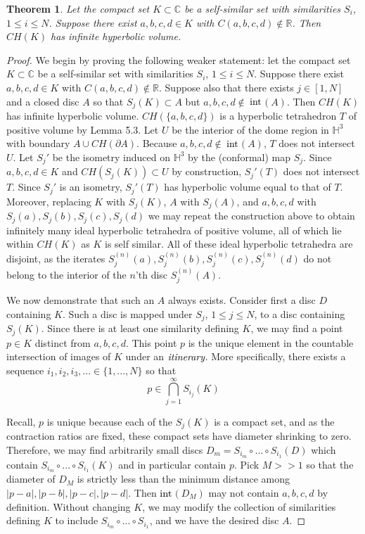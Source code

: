 \documentclass[11pt]{article}
\newtheorem{tm}{Theorem}[section]
\newcommand\comp{{\mathbb{C}}}
\begin{document}
\begin{tm}
    Let the compact set  $K \subset \comp$ be a self-similar set with similarities $S_i$, $1 \leq i \leq N$. Suppose there exist $a,b,c,d \in K$ with $C(a,b,c,d) \notin \mathbb{R}$. Then $CH(K)$ has infinite hyperbolic volume.
\end{tm}

 \begin{proof}We begin by proving the following weaker statement: let the compact set  $K \subset \comp$ be a self-similar set with similarities $S_i$, $1 \leq i \leq N$. Suppose there exist $a,b,c,d \in K$ with $C(a,b,c,d) \notin \mathbb{R}$. Suppose also that there exists $j \in [1,N]$ and a closed disc $A$ so that $S_j(K) \subset A$ but $a,b,c,d \notin \ $$ \rm{int}$$(A)$. Then $CH(K)$ has infinite hyperbolic volume. $CH(\{a,b,c,d\})$ is a hyperbolic tetrahedron $T$ of positive volume by Lemma 5.3. Let $U$ be the interior of the dome region in $\mathbb{H}^3$ with boundary $A \cup CH(\partial A)$. Because $a,b,c,d \notin \ $$\rm{int}$$(A)$, $T$ does not intersect $U$. Let $S_j'$ be the isometry induced on $\mathbb{H}^3$ by the (conformal) map $S_j$. Since $a,b,c,d \in K$ and $CH(S_j(K)) \subset U$ by construction, $S_j'(T)$ does not intersect $T$. Since $S_j'$ is an isometry, $S_j'(T)$ has hyperbolic volume equal to that of $T$.  Moreover, replacing $K$ with $S_j(K)$, $A$ with $S_j(A)$, and $a,b,c,d$ with $S_j(a), S_j(b), S_j(c), S_j(d)$ we may repeat the construction above to obtain infinitely many ideal hyperbolic tetrahedra of positive volume, all of which lie within $CH(K)$ as $K$ is self similar. All of these ideal hyperbolic tetrahedra are disjoint, as the iterates $S_j^{(n)}(a), S_j^{(n)}(b), S_j^{(n)}(c), S_j^{(n)}(d)$ do not belong to the interior of the $n$'th disc $S_j^{(n)}(A)$. 

\bigskip

We now demonstrate that such an $A$ always exists. Consider first a disc $D$ containing $K$. Such a disc is mapped under $S_j$, $1 \leq j \leq N$, to a disc containing $S_j(K)$. Since there is at least one similarity defining $K$, we may find a point $p \in K$ distinct from $a,b,c,d$. This point $p$ is the unique element in the countable intersection of images of $K$ under an $\emph{itinerary}$. More specifically, there exists a sequence $i_1,i_2,i_3,... \in  \{1,...,N\}$ so that $$p \in \bigcap_{j =1}^\infty S_{i_j}(K)$$

Recall, $p$ is unique because each of the $S_j(K)$ is a compact set, and as the contraction ratios are fixed, these compact sets have diameter shrinking to zero. Therefore, we may find arbitrarily small discs $D_m = S_{i_m} \circ ... \circ S_{i_1}(D)$ which contain $S_{i_m} \circ ... \circ S_{i_1}(K)$ and in particular contain $p$. Pick $M >> 1$ so that the diameter of $D_M$ is strictly less than the minimum distance among $|p-a|, |p-b|, |p-c|, |p-d|$. Then $\rm{int}$$(D_M)$ may not contain $a,b,c,d$ by definition. Without changing $K$, we may modify the collection of similarities defining $K$ to include $S_{i_m} \circ ... \circ S_{i_1}$, and we have the desired disc $A$. 
\end{proof}
\end{document}
